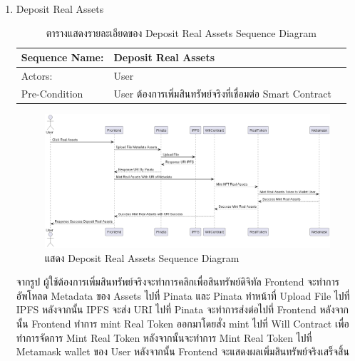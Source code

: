 \documentclass[12pt,oneside,openright,a4paper]{cpe-thai-project}
\begin{document}
\begin{enumerate}[label=\thesubsection.\arabic*,leftmargin=0pt,itemindent=1.25cm]
\clearpage
\item Deposit Real Assets
	\begin{table}[h]
	\centering
	\caption{ตารางแสดงรายละเอียดของ Deposit Real Assets Sequence Diagram}
	\begin{tabularx}{\textwidth}{|l|X|X|} 
		\hline
		Sequence Name: & Deposit Real Assets                          \\ 
		\hline
		Actors:        & User                                                  \\ 
		\hline
		Pre-Condition  & User ต้องการเพิ่มสินทรัพย์จริงที่เชื่อมต่อ Smart
		  Contract  \\
		\hline
		\end{tabularx}
	\end{table}
		\begin{figure}[!thb]
			\centering
			\includegraphics[scale=0.35]{depositRealseq}
			\caption{แสดง Deposit Real Assets Sequence Diagram}
		\end{figure}
		\FloatBarrier
	\tab จากรูป ผู้ใช้ต้องการเพิ่มสินทรัพย์จริงจะทำการคลิกเพื่อสินทรัพย์ดิจิทัล Frontend จะทำการอัพโหลด Metadata ของ Assets ไปที่ Pinata และ Pinata ทำหน้าที่ Upload File ไปที่ IPFS หลังจากนั้น IPFS จะส่ง URI ไปที่ Pinata จะทำการส่งต่อไปที่ Frontend หลังจากนั้น Frontend ทำการ mint Real Token ออกมาโดยสั่ง mint ไปที่ Will Contract เพื่อทำการจัดการ Mint Real Token หลังจากนั้นจะทำการ Mint Real Token ไปที่ Metamask wallet ของ User หลังจากนั้น Frontend จะแสดงผลเพิ่มสินทรัพย์จริงเสร็จสิ้น
	

\end{enumerate}
\end{document}
